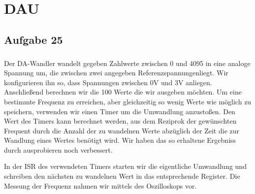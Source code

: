 \chapter{DAU}

\section*{Aufgabe 25}

\paragraph*{}
Der DA-Wandler wandelt gegeben Zahlwerte zwischen 0 und 4095 in eine analoge Spannung um, die zwischen zwei angegeben Referenzspannungenliegt. Wir konfigurieren ihn so, dass Spannungen zwischen 0V und 3V anliegen. Anschließend berechnen wir die 100 Werte die wir ausgeben möchten. Um eine bestimmte Frequenz zu erreichen, aber gleichzeitig so wenig Werte wie möglich zu speichern, verwenden wir einen Timer um die Umwandlung anzustoßen. Den Wert des Timers kann berechnet werden, aus dem Reziprok der gewünschten Frequent durch die Anzahl der zu wandelnen Werte abzüglich der Zeit die zur Wandlung eines Wertes benötigt wird. Wir haben das so erhaltene Ergebniss durch ausprobieren noch verbessert.



In der ISR des verwendeten Timers starten wir die eigentliche Umwandlung und schreiben den nächsten zu wandelnen Wert in das entsprechende Register. Die Messung der Frequenz nahmen wir mittels des Oszilloskops vor.


